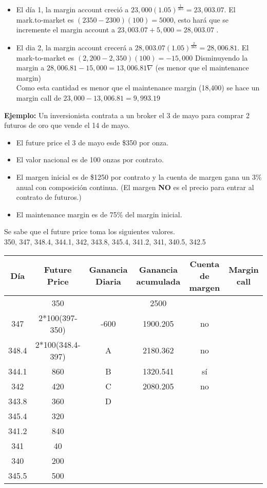 \documentclass[12pts]{extarticle}
\begin{document}
\\ 
\begin{itemize}
\item El día 1, la margin account creció a $23,000(1.05)^{\frac{1}{365}}=23,003.07.$ El mark.to-market es $(2350-2300)(100)=5000$, esto hará que se incremente el margin account a $23,003.07+5,000=28,003.07$ .
\item El dia 2, la margin account crecerá a $28,003.07(1.05)^{\frac{2}{365}}=28,006.81$. El mark-to-market es $(2,200-2,350)(100)=-15,000$ Disminuyendo la margin a $28,006.81-15,000=13,006.81 \nabla$  (es menor que el maintenance margin) \\ Como esta cantidad es menor que el maintenance margin (18,400) se hace un margin call de $23,000-13,006.81=9,993.19$  
\end{itemize}

\textbf{Ejemplo:} Un inversionista contrata a un broker el 3 de mayo para comprar 2 futuros de oro que vende el 14 de mayo.
\begin{itemize}
\item El future price el 3 de mayo esde \$350 por onza.  
\item El valor nacional es de 100 onzas por contrato. 
\item El margen inicial es de \$1250 por contrato y la cuenta de margen gana un 3\% anual con composición continua. (El margen \textbf{NO} es el precio para entrar al contrato de futuros.)
\item El maintenance margin es de 75\% del  margin inicial. 
\end{itemize} 
Se sabe que el future price toma los siguientes valores. \\
350, 347, 348.4, 344.1, 342, 343.8, 345.4, 341.2, 341, 340.5, 342.5 \\
\begin{center}
 \begin{tabular}{||c c c c c c||} 
 \hline
 Día & Future Price & Ganancia Diaria & Ganancia acumulada & Cuenta de margen & Margin call \\ [0.5ex] 
 \hline\hline
 & 350 &&2500&\\ 
 \hline
 347& 2*100(397-350)&-600&1900.205&no \\
 \hline
 348.4 & 2*100(348.4-397)& A & 2180.362 & no \\
 \hline
 344.1 & 860 & B & 1320.541 & sí\\
 \hline
 342 & 420 & C & 2080.205 & no\\  
 \hline
343.8 & 360 & D &&\\ 
\hline
345.4 & 320 & & & \\
\hline 
341.2 & 840 & & & \\
\hline 
341 & 40 & &  & \\
\hline 
340 & 200 & & & \\
\hline
345.5 & 500 & & & \\ [1ex]
\hline
\end{tabular}
\end{center}
\end{document}
